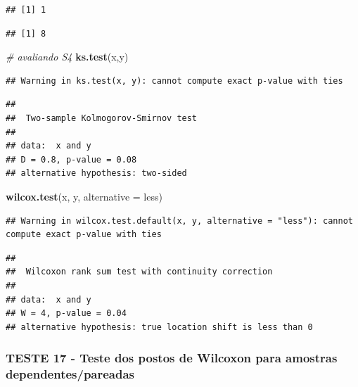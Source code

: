 \documentclass[
]{book}
\newenvironment{Shaded}{\begin{snugshade}}{\end{snugshade}}
\newcommand{\CommentTok}[1]{\textcolor[rgb]{0.56,0.35,0.01}{\textit{#1}}}
\newcommand{\DataTypeTok}[1]{\textcolor[rgb]{0.13,0.29,0.53}{#1}}
\newcommand{\KeywordTok}[1]{\textcolor[rgb]{0.13,0.29,0.53}{\textbf{#1}}}
\newcommand{\NormalTok}[1]{#1}
\newcommand{\StringTok}[1]{\textcolor[rgb]{0.31,0.60,0.02}{#1}}
\theoremstyle{definition}
\theoremstyle{definition}
\theoremstyle{definition}
\theoremstyle{remark}
\begin{document}
\begin{verbatim}
## [1] 1
\end{verbatim}

\begin{verbatim}
## [1] 8
\end{verbatim}

\begin{Shaded}
\begin{Highlighting}[]
\CommentTok{\# avaliando S4}
\KeywordTok{ks.test}\NormalTok{(x,y)}
\end{Highlighting}
\end{Shaded}

\begin{verbatim}
## Warning in ks.test(x, y): cannot compute exact p-value with ties
\end{verbatim}

\begin{verbatim}
## 
##  Two-sample Kolmogorov-Smirnov test
## 
## data:  x and y
## D = 0.8, p-value = 0.08
## alternative hypothesis: two-sided
\end{verbatim}

\begin{Shaded}
\begin{Highlighting}[]
\KeywordTok{wilcox.test}\NormalTok{(x, y, }\DataTypeTok{alternative  =} \StringTok{\textquotesingle{}less\textquotesingle{}}\NormalTok{)}
\end{Highlighting}
\end{Shaded}

\begin{verbatim}
## Warning in wilcox.test.default(x, y, alternative = "less"): cannot compute exact p-value with ties
\end{verbatim}

\begin{verbatim}
## 
##  Wilcoxon rank sum test with continuity correction
## 
## data:  x and y
## W = 4, p-value = 0.04
## alternative hypothesis: true location shift is less than 0
\end{verbatim}

\hypertarget{teste-17---teste-dos-postos-de-wilcoxon-para-amostras-dependentespareadas}{%
\subsubsection*{TESTE 17 - Teste dos postos de Wilcoxon para amostras dependentes/pareadas}\label{teste-17---teste-dos-postos-de-wilcoxon-para-amostras-dependentespareadas}}
\end{document}
